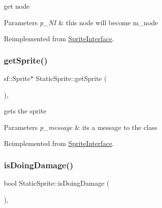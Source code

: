 get node 


\begin{DoxyParams}{Parameters}
{\em p\+\_\+\+NI} & this node will become m\+\_\+node \\
\hline
\end{DoxyParams}


Reimplemented from \mbox{\hyperlink{class_sprite_interface_a0cda548d74975cb3dd3f4d163a1763b6}{Sprite\+Interface}}.

\mbox{\label{class_static_sprite_a516a9a18b60573cd0b3a5fd6199be0b9}} 
\subsubsection{\texorpdfstring{get\+Sprite()}{getSprite()}}
{\footnotesize\ttfamily sf\+::\+Sprite$\ast$ Static\+Sprite\+::get\+Sprite (\begin{DoxyParamCaption}{ }\end{DoxyParamCaption})\hspace{0.3cm}{\ttfamily [override]}, {\ttfamily [virtual]}}



gets the sprite 


\begin{DoxyParams}{Parameters}
{\em p\+\_\+message} & its a message to the class \\
\hline
\end{DoxyParams}


Reimplemented from \mbox{\hyperlink{class_sprite_interface}{Sprite\+Interface}}.

\mbox{\label{class_static_sprite_a4b037abeff328dd42777875fd145aae3}} 
\subsubsection{\texorpdfstring{is\+Doing\+Damage()}{isDoingDamage()}}
{\footnotesize\ttfamily bool Static\+Sprite\+::is\+Doing\+Damage (\begin{DoxyParamCaption}{ }\end{DoxyParamCaption})\hspace{0.3cm}{\ttfamily [override]}, {\ttfamily [virtual]}}



